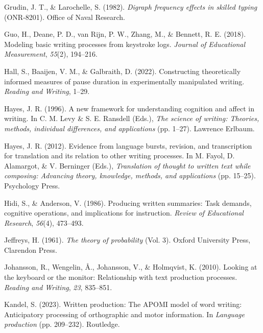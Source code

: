 \documentclass[
  man,floatsintext]{apa7}
\newlength{\cslhangindent}
\newlength{\cslentryspacingunit} %
\newenvironment{CSLReferences}[2] %
 {%
  \setlength{\parindent}{0pt}
  \ifodd #1
  \let\oldpar\par
  \def\par{\hangindent=\cslhangindent\oldpar}
  \fi
  \setlength{\parskip}{#2\cslentryspacingunit}
 }%
 {}
\begin{document}
\begin{CSLReferences}{1}{0}
\leavevmode{}%
Grudin, J. T., \& Larochelle, S. (1982). \emph{Digraph frequency effects in skilled typing} (ONR-8201). Office of Naval Research.

\leavevmode{}%
Guo, H., Deane, P. D., van Rijn, P. W., Zhang, M., \& Bennett, R. E. (2018). Modeling basic writing processes from keystroke logs. \emph{Journal of Educational Measurement}, \emph{55}(2), 194--216.

\leavevmode{}%
Hall, S., Baaijen, V. M., \& Galbraith, D. (2022). Constructing theoretically informed measures of pause duration in experimentally manipulated writing. \emph{Reading and Writing}, 1--29.

\leavevmode{}%
Hayes, J. R. (1996). A new framework for understanding cognition and affect in writing. In C. M. Levy \& S. E. Ransdell (Eds.), \emph{The science of writing: Theories, methods, individual differences, and applications} (pp. 1--27). Lawrence Erlbaum.

\leavevmode{}%
Hayes, J. R. (2012). Evidence from language bursts, revision, and transcription for translation and its relation to other writing processes. In M. Fayol, D. Alamargot, \& V. Berninger (Eds.), \emph{Translation of thought to written text while composing: Advancing theory, knowledge, methods, and applications} (pp. 15--25). Psychology Press.

\leavevmode{}%
Hidi, S., \& Anderson, V. (1986). Producing written summaries: Task demands, cognitive operations, and implications for instruction. \emph{Review of Educational Research}, \emph{56}(4), 473--493.

\leavevmode{}%
Jeffreys, H. (1961). \emph{The theory of probability} (Vol. 3). Oxford University Press, Clarendon Press.

\leavevmode{}%
Johansson, R., Wengelin, Å., Johansson, V., \& Holmqvist, K. (2010). Looking at the keyboard or the monitor: Relationship with text production processes. \emph{Reading and Writing}, \emph{23}, 835--851.

\leavevmode{}%
Kandel, S. (2023). Written production: The {APOMI} model of word writing: Anticipatory processing of orthographic and motor information. In \emph{Language production} (pp. 209--232). Routledge.


\end{CSLReferences}
\end{document}
